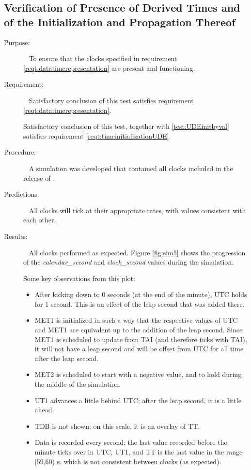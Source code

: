 \clearpage

\subsection{Verification of Presence of Derived Times and of the Initialization and Propagation Thereof}
  \label{test:clockpresence}
\begin{description}
\item[Purpose:]\ \newline
To ensure that the clocks specified in requirement \ref{reqt:datatimerepresentation} are present and functioning.

\item[Requirement:]\ \newline
Satisfactory conclusion of this test satisfies requirement \ref{reqt:datatimerepresentation}.

Satisfactory conclusion of this test, together with \ref{test:UDEinitbyval} satisfies requirement \ref{reqt:timeinitializationUDE}.


\item[Procedure:]\ \newline
A simulation was developed that contained all clocks included in the release of \JEODid.

\item[Predictions:]\ \newline
All clocks will tick at their appropriate rates, with values consistent with each other.

\item[Results:]\ \newline
All clocks performed as expected.  Figure \ref{fig:sim5} shows the progression of the \textit{calendar\_second} and \textit{clock\_second} values during the simulation.

Some key observations from this plot:
\begin{itemize}
	\item After kicking down to 0 seconds (at the end of the minute), UTC holds for 1 second.  This is an effect of the leap second that was added there.
	\item MET1 is initialized in such a way that the respective values of UTC and MET1 are equivalent up to the addition of the leap second.  Since MET1 is scheduled to update from TAI (and therefore ticks with TAI), it will not have a leap second and will be offset from UTC for all time after the leap second.
	\item MET2 is scheduled to start with a negative value, and to hold during the middle of the simulation.
	\item UT1 advances a little behind UTC; after the leap second, it is a little ahead. 
	\item TDB is not shown; on this scale, it is an overlay of TT.
	\item Data is recorded every second; the last value recorded before the minute ticks over in UTC, UT1, and TT  is the last value in the range [59,60) s, which is not consistent between clocks (as expected).
	

\end{itemize}
\end{description}
